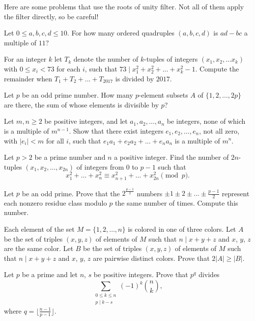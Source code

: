 \documentclass{scrartcl}
\begin{document}
Here are some problems that use the roots of unity filter. Not all of them apply 
the filter directly, so be careful! 

\begin{problem}
	Let $0\le a, b, c, d\le 10$. For how many ordered quadruples $(a, b, c, d)$ is $ad-bc$ a multiple of $11$?
\end{problem}

\begin{problem}
	For an integer $k$ let $T_k$ denote the number of $k$-tuples of integers $(x_1,x_2,...x_k)$ 
	with $0\le x_i < 73$ for each $i$, such that $73\mid x_1^2+x_2^2+...+x_k^2-1$. 
	Compute the remainder when $T_1+T_2+...+T_{2017}$ is divided by $2017$.
\end{problem}

\begin{problem}[IMO 1995]
	Let $p$ be an odd prime number. How many $p$-element subsets $A$ of $\{1,2,\dots,2p\}$ 
	are there, the sum of whose elements is divisible by $p$?
\end{problem}

\begin{problem}[Shortlist 2002]
	Let $m,n \geq 2$ be positive integers, and let $a_1,a_2,\ldots ,a_n$ be integers, 
	none of which is a multiple of $m^{n-1}$. 
	Show that there exist integers $e_1,e_2,\dots,e_n$, not all zero, with 
	$|e_i|<m$ for all $i$, such that 
	$e_1a_1+e_2a_2+\dots+e_na_n$ is a multiple of $m^n$.
\end{problem}

\begin{problem}
	Let $p>2$ be a prime number and $n$ a positive integer. Find the number of 
	$2n$-tuples $(x_1, x_2,\dots, x_{2n})$ of integers from $0$ to $p-1$ such that 
	$$x_1^2+\dots+x_n^2 \equiv x_{n+1}^2+\dots+x_{2n}^2 \pmod p.$$
\end{problem}

\begin{problem}[AMM]
	Let $p$ be an odd prime. Prove that the $2^{\frac{p-1}{2}}$ numbers $\pm 1 \pm 2 \pm \dots \pm \frac{p-1}{2}$ 
	represent each nonzero residue class modulo $p$ the same number of times. 
	Compute this number. 
\end{problem}

\begin{problem}
	Each element of the set $M=\{1, 2, \dots, n\}$ is colored in one of three colors. 
	Let $A$ be the set of triples $(x, y, z)$ of elements of $M$ such that $n\mid x+y+z$ 
	and $x$, $y$, $z$ are the same color. 
	Let $B$ be the set of triples $(x, y, z)$ of elements of $M$ such that $n\mid x+y+z$ 
	and $x$, $y$, $z$ are pairwise distinct colors. 
	Prove that $2|A|\ge |B|$. 
\end{problem}

\begin{problem}
	Let $p$ be a prime and let $n$, $s$ be positive integers. Prove that $p^q$ divides
	$$\sum_{\substack{0 \leq k \leq n\\ p \mid k-s}} (-1)^k \binom{n}{k},$$
	where $q= \lfloor{\frac{n-1}{p-1}}\rfloor$.
\end{problem}
\end{document}
